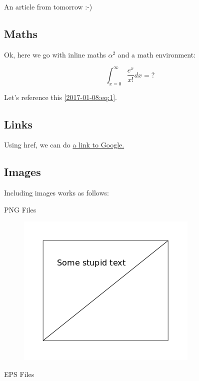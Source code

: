 
An article from tomorrow :-)

\subsection*{Maths}

Ok, here we go with inline maths $\alpha^2$ and a math environment:

\begin{equation}
\label{2017-01-08:eq:1}
\int_{x=0}^\infty \frac{e^x}{x!} dx = ?
\end{equation}

Let's reference this \eqref{2017-01-08:eq:1}.

\subsection*{Links}

Using href, we can do \href{http://www.google.at}{a link to Google.}
\subsection*{Images}

Including images works as follows:

PNG Files

\begin{figure}[H]
    \includegraphics[scale=0.5]{images/drawing.png}
\end{figure}

EPS Files

